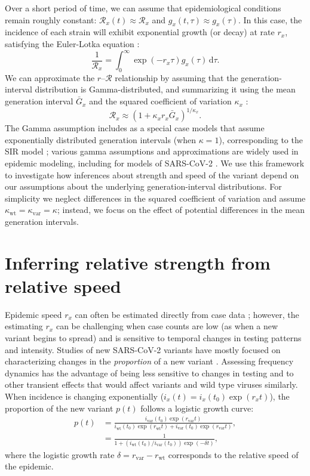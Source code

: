\documentclass[12pt]{article}
\newcommand{\vvvar}{\mathrm{var}}
\newcommand{\wwwt}{\mathrm{wt}}
\newcommand{\rx}[1]{\ensuremath{{r}_{#1}}\xspace}
\newcommand{\rw}{\rx{\wwwt}}
\newcommand{\rv}{\rx{\vvvar}}
\newcommand{\RR}{\ensuremath{{\mathcal R}}\xspace}
\newcommand{\dd}[1]{\ensuremath{\, \mathrm{d}#1}}
\newcommand{\dtau}{\dd{\tau}}
\newcommand{\ix}[1]{\ensuremath{{i}_{#1}}\xspace}
\newcommand{\iw}{\ix{\wwwt}}
\newcommand{\iv}{\ix{\vvvar}}
\begin{document}
Over a short period of time, we can assume that epidemiological conditions remain roughly constant: $\RR_x(t) \approx \RR_x$ and $g_x(t, \tau) \approx g_x(\tau)$.
In this case, the incidence of each strain will exhibit exponential growth (or decay) at rate $r_x$, satisfying the Euler-Lotka equation \citep{wallinga2007generation}:
\begin{equation}
\frac{1}{\RR_x} = \int_0^\infty \exp(- r_x \tau) g_x(\tau) \dtau.
\end{equation}
We can approximate the $r$--$\RR$ relationship by assuming that the generation-interval distribution is Gamma-distributed, and summarizing it using the mean generation interval $\bar{G}_x$ and the squared coefficient of variation $\kappa_x$ \citep{park2019practical}:
\begin{equation}
\RR_x \approx (1 + \kappa_x r_x \bar{G}_x)^{1/\kappa_x}.
\end{equation}
The Gamma assumption includes as a special case models that assume exponentially distributed generation intervals (when $\kappa=1$), corresponding to the SIR model \citep{anderson1991infectious}; various gamma assumptions and approximations are widely used in epidemic modeling, including for models of SARS-CoV-2 \citep{doi:10.1098/rsif.2020.0144}.
We use this framework to investigate how inferences about strength and speed of the variant depend on our assumptions about the underlying generation-interval distributions.
For simplicity we neglect differences in the squared coefficient of variation and assume $\kappa_{\mathrm{wt}} = \kappa_{\mathrm{var}} = \kappa$; instead, we focus on the effect of potential differences in the mean generation intervals.

\section{Inferring relative strength from relative speed}

Epidemic speed $r_x$ can often be estimated directly from case data \citep{mills2004transmissibility,nishiura2009transmission,ma2014estimating};
however, the estimating $r_x$ can be challenging when case counts are low (as when a new variant begins to spread) and is sensitive to temporal changes in testing patterns and intensity.
Studies of new SARS-CoV-2 variants have mostly focused on characterizing changes in the \emph{proportion} of a new variant \citep{switzerland2021variant, davies2021estimated, di2021impact, leung2021early, volz2021transmission,zhao2021}.
Assessing frequency dynamics has the advantage of being less sensitive to changes in testing and to other transient effects that would affect variants and wild type viruses similarly.
When incidence is changing exponentially ($i_x(t) = i_x(t_0) \exp(r_x t)$), the proportion of the new variant $p(t)$ follows a logistic growth curve:
\begin{align}
p(t) &= \frac{\iv(t_0) \exp(\rv t)}{\iw(t_0) \exp(\rw t) + \iv(t_0) \exp(\rv t)},
\\ &= \frac{1}{1 + \left(\iw(t_0)/\iv(t_0)\right) \exp(-\delta t)},
\end{align}
where the logistic growth rate $\delta = \rv - \rw$ corresponds to the relative speed of the epidemic.
\end{document}
